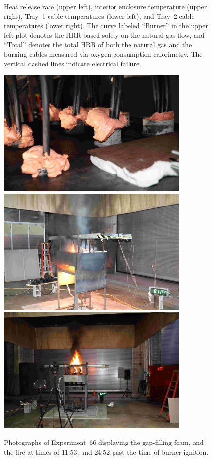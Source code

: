 \begin{figure}[H]
\caption[HRR and temperatures of Experiment 66]{Heat release rate (upper left), interior enclosure temperature (upper right), Tray~1 cable temperatures (lower left), and Tray~2 cable temperatures (lower right). The curve labeled ``Burner'' in the upper left plot denotes the HRR based solely on the natural gas flow, and ``Total'' denotes the total HRR of both the natural gas and the burning cables measured via oxygen-consumption calorimetry. The vertical dashed lines indicate electrical failure.}
\label{fig:Test_66}
\end{figure}

\begin{figure}[p]
\centering
\includegraphics[height=2.50in]{../FIGURES/Test_66_Photo_1} \\ \vspace{0.1in}
\includegraphics[height=2.50in]{../FIGURES/Test_66_Photo_2} \\ \vspace{0.1in}
\includegraphics[height=2.50in]{../FIGURES/Test_66_Photo_3}
\caption[Photographs of Experiment~66]{Photographs of Experiment~66 displaying the gap-filling foam, and the fire at times of 11:53, and 24:52 past the time of burner ignition.}
\label{fig:Test_66_photos}
\end{figure}




